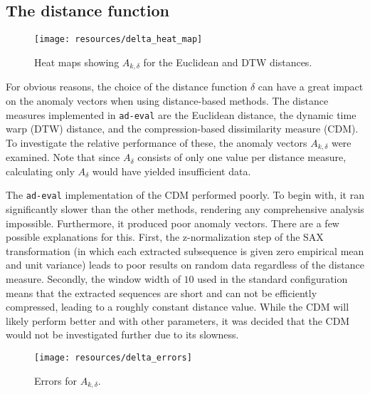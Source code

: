 \subsection{The distance function}
\FloatBarrier

\begin{figure}[ht]
    \vspace{-20pt}
    \begin{center}
        \texttt{[image: resources/delta\_heat\_map]}
    \end{center}
    \vspace{-20pt}
    \caption{\small{Heat maps showing $A_{k, \delta}$ for the Euclidean and DTW distances.}}
    \vspace{-10pt}
    \label{fig:delta_heat_map}
\end{figure}

For obvious reasons, the choice of the distance function $\delta$ can have a great impact on the anomaly vectors when using distance-based methods. The distance measures implemented in \texttt{ad-eval} are the Euclidean distance, the dynamic time warp (DTW) distance, and the compression-based dissimilarity measure (CDM). To investigate the relative performance of these, the anomaly vectors $A_{k, \delta}$ were examined. Note that since $A_{\delta}$ consists of only one value per distance measure, calculating only $A_\delta$ would have yielded insufficient data.

The \texttt{ad-eval} implementation of the CDM performed poorly. To begin with, it ran significantly slower than the other methods, rendering any comprehensive analysis impossible. Furthermore, it produced poor anomaly vectors. There are a few possible explanations for this. First, the z-normalization step of the SAX transformation (in which each extracted subsequence is given zero empirical mean and unit variance) leads to poor results on random data regardless of the distance measure. Secondly, the window width of $10$ used in the standard configuration means that the extracted sequences are short and can not be efficiently compressed, leading to a roughly constant distance value. While the CDM will likely perform better and with other parameters, it was decided that the CDM would not be investigated further due to its slowness.

\begin{wrapfigure}{r}{0.5\textwidth}
    \vspace{-30pt}
    \begin{center}
        \texttt{[image: resources/delta\_errors]}
    \end{center}
    \vspace{-20pt}
    \caption{\small{Errors for $A_{k, \delta}$.}}
    \vspace{-10pt}
    \label{fig:delta_errors}
\end{wrapfigure}

